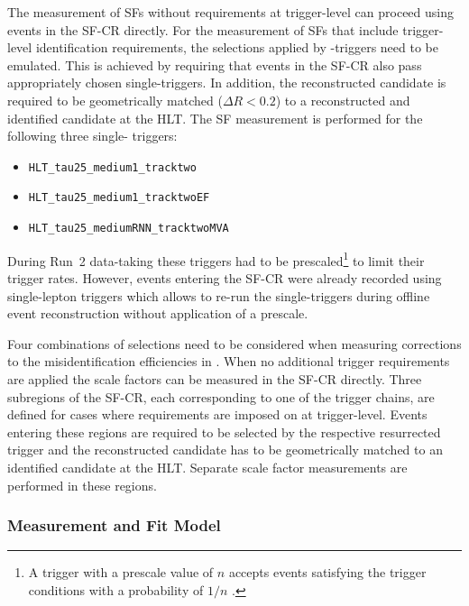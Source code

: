 The measurement of SFs without requirements at trigger-level can
proceed using events in the SF-CR directly. For the measurement of SFs
that include trigger-level identification requirements, the selections
applied by \tauhadvis-triggers need to be emulated. This is achieved
by requiring that events in the SF-CR also pass appropriately chosen
single-\tauhadvis triggers. In addition, the reconstructed \tauhadvis
candidate is required to be geometrically matched ($\Delta R < 0.2$)
to a reconstructed and identified \tauhadvis candidate at the HLT. The
SF measurement is performed for the following three single-\tauhadvis
triggers:
\begin{itemize}
\item \verb|HLT_tau25_medium1_tracktwo| %
\item \verb|HLT_tau25_medium1_tracktwoEF| %
\item \verb|HLT_tau25_mediumRNN_tracktwoMVA| %
\end{itemize}
During Run~2 data-taking these triggers had to be prescaled\footnote{A
  trigger with a prescale value of $n$ accepts events satisfying the
  trigger conditions with a probability of $1 / n$
  \cite{TRIG-2019-04}.} to limit their trigger rates. However, events
entering the SF-CR were already recorded using single-lepton triggers
which allows to re-run the single-\tauhadvis triggers during offline
event reconstruction without application of a prescale.




Four combinations of \tauhadvis selections need to be considered when
measuring corrections to the \jettotauhadvis misidentification
efficiencies in \ttbar. When no additional trigger requirements are
applied the scale factors can be measured in the SF-CR directly. Three
subregions of the SF-CR, each corresponding to one of the trigger
chains, are defined for cases where requirements are imposed on
\tauhadvis at trigger-level. Events entering these regions are
required to be selected by the respective resurrected trigger and the
reconstructed \tauhadvis candidate has to be geometrically matched to
an identified \tauhadvis candidate at the HLT. Separate scale factor
measurements are performed in these regions.


\subsubsection{Measurement and Fit Model}

